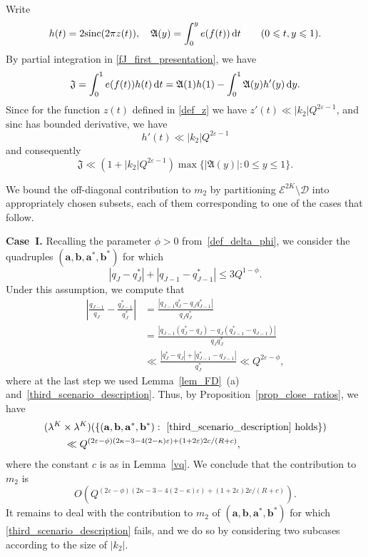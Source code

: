 \documentclass[12pt, reqno]{amsart}
\theoremstyle{definition}
\theoremstyle{remark}
\numberwithin{equation}{section}
\def\kap{{\kappa}}
\def\eps{\varepsilon}
\def\le{\leqslant} \def\ge{\geqslant}
\def\ls{\leqslant} \def\gs{\geqslant}
\def\d{{\,{\rm d}}}
\def \ba {\mathbf a}
\def \bb {\mathbf b}
\def \fA {\mathfrak A}
\def \fJ {\mathfrak J}
\def \cD {\mathcal D}
\def \cE {\mathcal E}
\def \sinc {\mathrm{sinc}}
\begin{document}
Write 
\begin{equation} \label{sha_def}
h(t) = 2 \sinc(2 \pi z(t)),
\quad \fA(y) = \int_0^y e(f(t)) \d t \qquad (0\ls t,y \ls 1).
\end{equation}
By partial integration in \eqref{fJ_first_presentation}, we have
\[
\fJ = \int_0^1 e(f(t)) h(t) \d t = \fA(1) h(1) - \int_0^1 \fA(y) h'(y) 
\d y.
\]
Since for the function $ z(t)$ defined in \eqref{def_z} we have $z'(t) \ll |k_2| Q^{2\eps - 1}$, and $\sinc$ has bounded derivative, we have
\[
h'(t) \ll |k_2| Q^{2\eps - 1} 
\]
and consequently
\begin{equation} \label{ub_J_second}
\fJ \ll (1 + |k_2| Q^{2\eps - 1}) \max \{ |\fA(y)|: 0 \le y \le 1 \}.
\end{equation}

We bound the off-diagonal contribution to $m_2$ by partitioning $\cE^{2K}\setminus \cD$ into appropriately chosen subsets, each of them corresponding to one of the cases that follow.

\bigskip


\textbf{Case~I.} Recalling the parameter $\phi>0$ from~\eqref{def_delta_phi}, we consider the quadruples $(\ba,\bb,\ba^*,\bb^*)$ for which
\begin{equation} \label{third_scenario_description}
|q_J - q_J^*| +
|q_{J-1} - q_{J-1}^*| 
\le 3Q^{1-\phi}.
\end{equation}
Under this assumption, we compute that
\[
\begin{aligned}
\left|\frac{q_{J-1}}{q_J}-\frac{q_{J-1}^*}{q_J^*}\right|
&= \frac{|q_{J-1} q_J^*-q_{J} q_{J-1}^*|}{q_{J} q_J^*} \\
&= \frac{\left|q_{J-1} \left(q_J^*-q_J\right)-q_{J}\left(q_{J-1}^*-q_{J-1}\right)\right|}{q_{J}q_J^*}\\
&\ll \frac{|q_J^* - q_J| 
+ |q_{J-1}^* - q_{J-1}|}{q_J^*} \ll Q^{2\varepsilon-\phi},
\end{aligned} 
\]
where at the last step we used Lemma~\ref{lem_FD}~(a) and~\eqref{third_scenario_description}. Thus, by Proposition~\ref{prop_close_ratios},
we have
\begin{align*}
&(\lambda^K \times \lambda^K)(\{ (\ba,\bb,\ba^*,\bb^*) :  \text{ \eqref{third_scenario_description} holds}\})
\\ & \qquad \ll  Q^{(2\eps - \phi)
(2 \kap - 3 - 4(2-\kap)\eps)
+ (1 + 2\eps) 2c / (R+c)} ,
\end{align*}
where the constant $c$ is as in Lemma~\ref{vq}. We conclude that the  contribution to $m_2$ is 
\begin{equation}
\label{Contribution1}
O( Q^{(2\eps - \phi)
(2 \kap - 3 - 4(2-\kap)\eps)
+ (1 + 2\eps) 2c / (R+c)} ). 
\end{equation}
It remains to deal with the contribution to $m_2$ of $(\ba,\bb,\ba^*,\bb^*)$ for which \eqref{third_scenario_description} fails, and we do so by considering two subcases according to the size of $|k_2|.$ 
\end{document}
